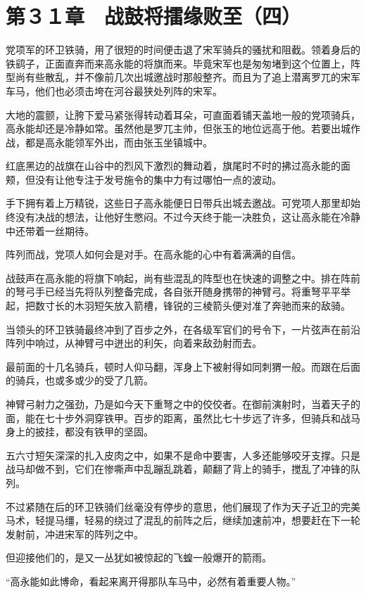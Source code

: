 \section{第３１章　战鼓将擂缘败至（四）}

党项军的环卫铁骑，用了很短的时间便击退了宋军骑兵的骚扰和阻截。领着身后的铁鹞子，正面直奔而来高永能的将旗而来。毕竟宋军也是匆匆堵到这个位置上，阵型尚有些散乱，并不像前几次出城邀战时那般整齐。而且为了追上潜离罗兀的宋军车马，他们也必须击垮在河谷最狭处列阵的宋军。

大地的震颤，让胯下爱马紧张得转动着耳朵，可直面着铺天盖地一般的党项骑兵，高永能却还是冷静如常。虽然他是罗兀主帅，但张玉的地位远高于他。若要出城作战，都是高永能领军外出，而由张玉坐镇城中。

红底黑边的战旗在山谷中的烈风下激烈的舞动着，旗尾时不时的拂过高永能的面颊，但没有让他专注于发号施令的集中力有过哪怕一点的波动。

手下拥有着上万精锐，这些日子高永能便日日带兵出城去邀战。可党项人那里却始终没有决战的想法，让他好生憋闷。不过今天终于能一决胜负，这让高永能在冷静中还带着一丝期待。

阵列而战，党项人如何会是对手。在高永能的心中有着满满的自信。

战鼓声在高永能的将旗下响起，尚有些混乱的阵型也在快速的调整之中。排在阵前的弩弓手已经当先将队列整备完成，各自张开随身携带的神臂弓。将重弩平平举起，把数寸长的木羽短矢放入箭槽，锋锐的三棱箭头便对准了奔驰而来的敌骑。

当领头的环卫铁骑最终冲到了百步之外，在各级军官们的号令下，一片弦声在前沿阵列中响过，从神臂弓中迸出的利矢，向着来敌劲射而去。

最前面的十几名骑兵，顿时人仰马翻，浑身上下被射得如同刺猬一般。而跟在后面的骑兵，也或多或少的受了几箭。

神臂弓射力之强劲，乃是如今天下重弩之中的佼佼者。在御前演射时，当着天子的面，能在七十步外洞穿铁甲。百步的距离，虽然比七十步远了许多，但骑兵和战马身上的披挂，都没有铁甲的坚固。

五六寸短矢深深的扎入皮肉之中，如果不是命中要害，人多还能够咬牙支撑。只是战马却做不到，它们在惨嘶声中乱蹦乱跳着，颠翻了背上的骑手，搅乱了冲锋的队列。

不过紧随在后的环卫铁骑们丝毫没有停步的意思，他们展现了作为天子近卫的完美马术，轻提马缰，轻易的绕过了混乱的前阵之后，继续加速前冲，想要赶在下一轮发射前，冲进宋军的阵列之中。

但迎接他们的，是又一丛犹如被惊起的飞蝗一般爆开的箭雨。

“高永能如此博命，看起来离开得那队车马中，必然有着重要人物。”

